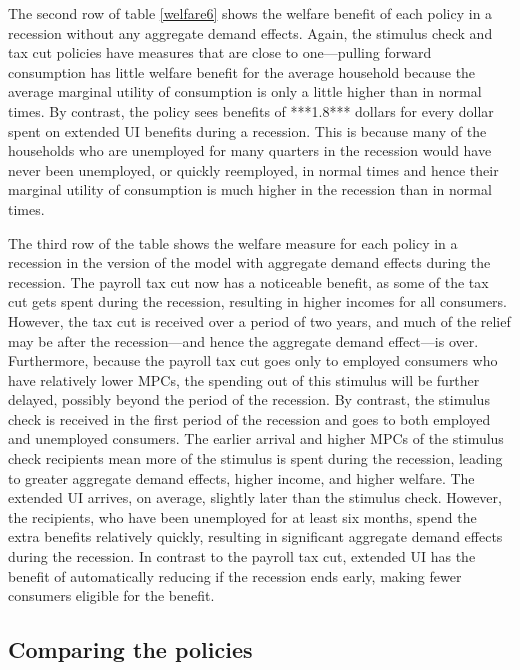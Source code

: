 \documentclass[\econtexRoot/HAFiscal]{subfiles}
\begin{document}
The second row of table \ref{welfare6} shows the welfare benefit of each policy in a recession without any aggregate demand effects. Again, the stimulus check and tax cut policies have measures that are close to one---pulling forward consumption has little welfare benefit for the average household because the average marginal utility of consumption is only a little higher than in normal times. By contrast, the policy sees benefits of ***1.8*** dollars for every dollar spent on extended UI benefits during a recession. This is because many of the households who are unemployed for many quarters in the recession would have never been unemployed, or quickly reemployed, in normal times and hence their marginal utility of consumption is much higher in the recession than in normal times.

The third row of the table shows the welfare measure for each policy in a recession in the version of the model with aggregate demand effects during the recession. The payroll tax cut now has a noticeable benefit, as some of the tax cut gets spent during the recession, resulting in higher incomes for all consumers. However, the tax cut is received over a period of two years, and much of the relief may be after the recession---and hence the aggregate demand effect---is over. Furthermore, because the payroll tax cut goes only to employed consumers who have relatively lower MPCs, the spending out of this stimulus will be further delayed, possibly beyond the period of the recession. By contrast, the stimulus check is received in the first period of the recession and goes to both employed and unemployed consumers. The earlier arrival and higher MPCs of the stimulus check recipients mean more of the stimulus is spent during the recession, leading to greater aggregate demand effects, higher income, and higher welfare. The extended UI arrives, on average, slightly later than the stimulus check. However, the recipients, who have been unemployed for at least six months, spend the extra benefits relatively quickly, resulting in significant aggregate demand effects during the recession. In contrast to the payroll tax cut, extended UI has the benefit of automatically reducing if the recession ends early, making fewer consumers eligible for the benefit.


\hypertarget{comparing-the-policies}{}\par\subsection{Comparing the policies} 
\end{document}
